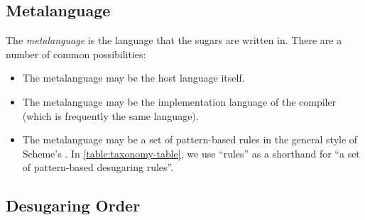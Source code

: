 

\subsection{Metalanguage}

The \emph{metalanguage} is the language that the sugars are written
in. There are a number of common possibilities:
\begin{itemize}
\item The metalanguage may be the host language itself.
\item The metalanguage may be the implementation language of the
  compiler (which is frequently the same language).
\item The metalanguage may be a set of pattern-based rules in the general
style of Scheme's . In \cref{table:taxonomy-table},
we use ``rules'' as a shorthand for ``a set of pattern-based
desugaring rules''.
\end{itemize}


\subsection{Desugaring Order}\label{sec:taxonomy-order}

